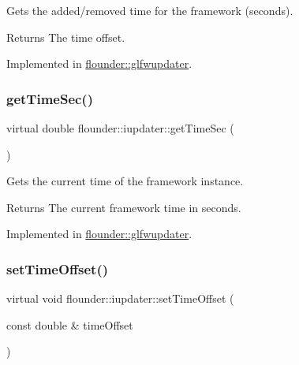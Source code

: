 Gets the added/removed time for the framework (seconds). 

\begin{DoxyReturn}{Returns}
The time offset. 
\end{DoxyReturn}


Implemented in \hyperlink{classflounder_1_1glfwupdater_a6393f60d2b0f84a78ccf14b0c55ae1ee}{flounder\+::glfwupdater}.

\mbox{\label{classflounder_1_1iupdater_a071086b844e1f90d7f3577e80c9c09fe}} 
\subsubsection{\texorpdfstring{get\+Time\+Sec()}{getTimeSec()}}
{\footnotesize\ttfamily virtual double flounder\+::iupdater\+::get\+Time\+Sec (\begin{DoxyParamCaption}{ }\end{DoxyParamCaption})\hspace{0.3cm}{\ttfamily [pure virtual]}}



Gets the current time of the framework instance. 

\begin{DoxyReturn}{Returns}
The current framework time in seconds. 
\end{DoxyReturn}


Implemented in \hyperlink{classflounder_1_1glfwupdater_a6982b83970693347bfa460adc04cf984}{flounder\+::glfwupdater}.

\mbox{\label{classflounder_1_1iupdater_aa6aa143e40a5a39bcd53753798438ea1}} 
\subsubsection{\texorpdfstring{set\+Time\+Offset()}{setTimeOffset()}}
{\footnotesize\ttfamily virtual void flounder\+::iupdater\+::set\+Time\+Offset (\begin{DoxyParamCaption}\item[{const double \&}]{time\+Offset }\end{DoxyParamCaption})\hspace{0.3cm}{\ttfamily [pure virtual]}}



